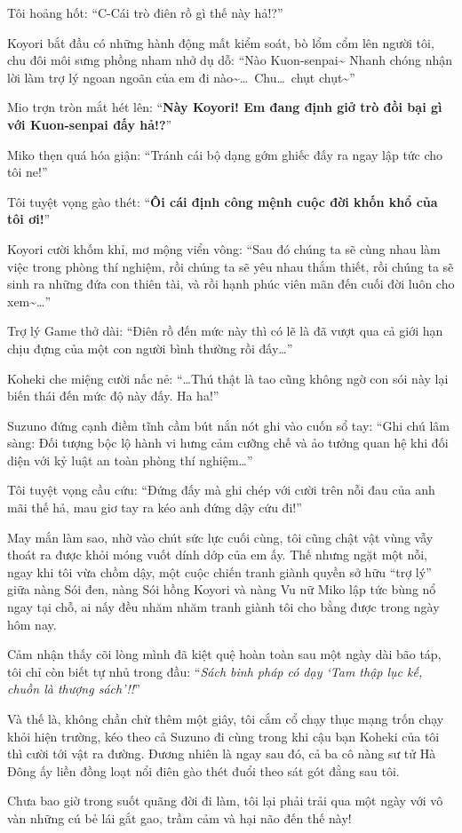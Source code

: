 \documentclass[../main.tex]{subfiles}
\begin{document}
Tôi hoảng hốt: ``C-Cái trò điên rồ gì thế này hả!?''

Koyori bắt đầu có những hành động mất kiểm soát, bò lổm cổm lên người tôi, chu đôi môi sưng phồng nham nhở dụ dỗ: ``Nào Kuon-senpai\~{} Nhanh chóng nhận lời làm trợ lý ngoan ngoãn của em đi nào\~{}\dots\ Chu\dots\ chụt chụt\~{}''

Mio trợn tròn mắt hét lên: ``\textbf{Này Koyori! Em đang định giở trò đồi bại gì với Kuon-senpai đấy hả!?}''

Miko thẹn quá hóa giận: ``Tránh cái bộ dạng gớm ghiếc đấy ra ngay lập tức cho tôi ne!''

Tôi tuyệt vọng gào thét: ``\textbf{Ôi cái định công mệnh cuộc đời khốn khổ của tôi ơi!}''

Koyori cười khốm khỉ, mơ mộng viển vông: ``Sau đó chúng ta sẽ cùng nhau làm việc trong phòng thí nghiệm, rồi chúng ta sẽ yêu nhau thắm thiết, rồi chúng ta sẽ sinh ra những đứa con thiên tài, và rồi hạnh phúc viên mãn đến cuối đời luôn cho xem\~{}\dots''

Trợ lý Game thở dài: ``Điên rồ đến mức này thì có lẽ là đã vượt qua cả giới hạn chịu đựng của một con người bình thường rồi đấy\dots''

Koheki che miệng cười nấc nẻ: ``\dots Thú thật là tao cũng không ngờ con sói này lại biến thái đến mức độ này đấy. Ha ha!''

Suzuno đứng cạnh điềm tĩnh cầm bút nắn nót ghi vào cuốn sổ tay: ``Ghi chú lâm sàng: Đối tượng bộc lộ hành vi hưng cảm cưỡng chế và ảo tưởng quan hệ khi đối diện với kỷ luật an toàn phòng thí nghiệm\dots''

Tôi tuyệt vọng cầu cứu: ``Đứng đấy mà ghi chép với cười trên nỗi đau của anh mãi thế hả, mau giơ tay ra kéo anh đứng dậy cứu đi!''

May mắn làm sao, nhờ vào chút sức lực cuối cùng, tôi cũng chật vật vùng vẫy thoát ra được khỏi móng vuốt dính dớp của em ấy. Thế nhưng ngặt một nỗi, ngay khi tôi vừa chồm dậy, một cuộc chiến tranh giành quyền sở hữu ``trợ lý'' giữa nàng Sói đen, nàng Sói hồng Koyori và nàng Vu nữ Miko lập tức bùng nổ ngay tại chỗ, ai nấy đều nhăm nhăm tranh giành tôi cho bằng được trong ngày hôm nay.

Cảm nhận thấy cõi lòng mình đã kiệt quệ hoàn toàn sau một ngày dài bão táp, tôi chỉ còn biết tự nhủ trong đầu: ``\textit{Sách binh pháp có dạy `Tam thập lục kế, chuồn là thượng sách'!!}''

Và thế là, không chần chừ thêm một giây, tôi cắm cổ chạy thục mạng trốn chạy khỏi hiện trường, kéo theo cả Suzuno đi cùng trong khi cậu bạn Koheki của tôi thì cười tới vật ra đường. Đương nhiên là ngay sau đó, cả ba cô nàng sư tử Hà Đông ấy liền đồng loạt nổi điên gào thét đuổi theo sát gót đằng sau tôi.

Chưa bao giờ trong suốt quãng đời đi làm, tôi lại phải trải qua một ngày với vô vàn những cú bẻ lái gắt gao, trầm cảm và hại não đến thế này!
\end{document}
